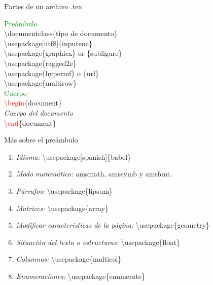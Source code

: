 \documentclass{beamer}
\begin{document}
\begin{frame}{Partes de un archivo .tex}
    \begin{block}{}
\hspace{2 cm}\textcolor{green}{Preámbulo}\\
\textbackslash documentclass\{tipo de documento\}\\
\textbackslash usepackage[utf8]\{inputenc\}\\ %
\textbackslash usepackage\{graphicx\} or \{subfigure\}\\%
\textbackslash usepackage\{ragged2e\}\\%
\textbackslash usepackage\{hyperref\} o \{url\}\\%
\textbackslash usepackage\{multirow\}\\%
\vspace{5 mm}
\hspace{2 cm}\textcolor{green}{Cuerpo}\\
\textcolor{red}{\textbackslash begin}\{document\}\\
    \hspace{1 cm}\textit{Cuerpo del documento}\\
\textcolor{red}{\textbackslash end}\{document\}\\
    \end{block}
\end{frame}

\begin{frame}{Más sobre el preámbulo}
\begin{enumerate}
    \item \textit{Idioma:} \textbackslash usepackage[spanish]\{babel\} %
    \item \textit{Modo matemático:} amsmath, amssymb y amsfont.%
    \item \textit{Párrafos:} \textbackslash usepackage\{lipsum\} %
    \item \textit{Matrices:} \textbackslash usepackage\{array\} %
    \item \textit{Modificar características de la página:} \textbackslash usepackage\{geometry\}
    \item \textit{Situación del texto o estructuras:} \textbackslash usepackage\{float\}
    \item \textit{Columnas:} \textbackslash usepackage\{multicol\}
    \item \textit{Enumeraciones:} \textbackslash usepackage\{enumerate\}
\end{enumerate}
\end{frame}
\end{document}

